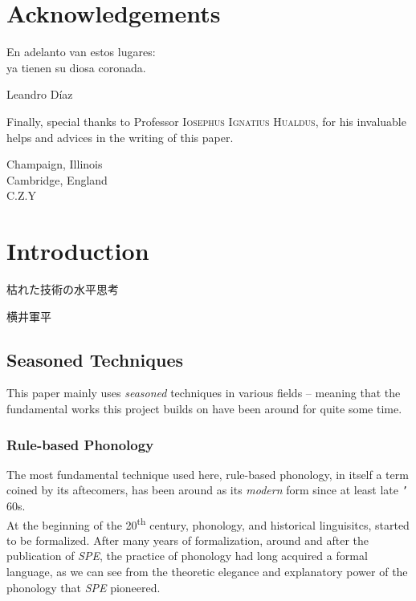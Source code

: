 \documentclass{report}[12pt]
\begin{document}
\pagebreak

\chapter{Acknowledgements}

\epigraph{En adelanto van estos lugares: \\ ya tienen su diosa coronada.}{Leandro Díaz}

Finally, special thanks to Professor \textsc{Iosephus Ignatius Hualdus}, for his invaluable helps and advices in the writing of this paper. 

\begin{flushright}
Champaign, Illinois \\
Cambridge, England \\
C.Z.Y
\end{flushright}

\chapter{Introduction}

\epigraph{枯れた技術の水平思考\footnotemark}{横井軍平}

\section{Seasoned Techniques}

This paper mainly uses \emph{seasoned} techniques in various fields -- meaning that the fundamental works this project builds on have been around for quite some time. 

\subsection{Rule-based Phonology}

The most fundamental technique used here, rule-based phonology, in itself a term coined by its aftecomers, has been around as its \emph{modern} form since at least late \texttt{'}\kern-1pt 60s. \\
At the beginning of the 20\textsuperscript{th} century, phonology, and historical linguisitcs, started to be formalized. After many years of formalization, around and after the publication of \emph{SPE}, the practice of phonology had long acquired a formal language, as we can see from the theoretic elegance and explanatory power of the phonology that \emph{SPE} pioneered.
\end{document}
